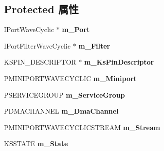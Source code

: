 \subsection*{Protected 属性}
\begin{DoxyCompactItemize}
\item 
\mbox{\label{class_c_port_pin_wave_cyclic_a8ba5536dbe46826ae5205a0c33d29007}} 
I\+Port\+Wave\+Cyclic $\ast$ {\bfseries m\+\_\+\+Port}
\item 
\mbox{\label{class_c_port_pin_wave_cyclic_ad934e90215fd723cbb0f575cbd99589e}} 
I\+Port\+Filter\+Wave\+Cyclic $\ast$ {\bfseries m\+\_\+\+Filter}
\item 
\mbox{\label{class_c_port_pin_wave_cyclic_ac46575b40634194e9d90d12258c23c81}} 
K\+S\+P\+I\+N\+\_\+\+D\+E\+S\+C\+R\+I\+P\+T\+OR $\ast$ {\bfseries m\+\_\+\+Ks\+Pin\+Descriptor}
\item 
\mbox{\label{class_c_port_pin_wave_cyclic_abaea9c6da08aff13c50a25810c9fb6bf}} 
P\+M\+I\+N\+I\+P\+O\+R\+T\+W\+A\+V\+E\+C\+Y\+C\+L\+IC {\bfseries m\+\_\+\+Miniport}
\item 
\mbox{\label{class_c_port_pin_wave_cyclic_a563268bb213ccf472036d452142c9d08}} 
P\+S\+E\+R\+V\+I\+C\+E\+G\+R\+O\+UP {\bfseries m\+\_\+\+Service\+Group}
\item 
\mbox{\label{class_c_port_pin_wave_cyclic_aa4a108d6ad2434eec11b5683fb89f91e}} 
P\+D\+M\+A\+C\+H\+A\+N\+N\+EL {\bfseries m\+\_\+\+Dma\+Channel}
\item 
\mbox{\label{class_c_port_pin_wave_cyclic_a173c5b112284e6ff6dcf446878a557b1}} 
P\+M\+I\+N\+I\+P\+O\+R\+T\+W\+A\+V\+E\+C\+Y\+C\+L\+I\+C\+S\+T\+R\+E\+AM {\bfseries m\+\_\+\+Stream}
\item 
\mbox{\label{class_c_port_pin_wave_cyclic_a567c68370169321294a0b7de38bc91d7}} 
K\+S\+S\+T\+A\+TE {\bfseries m\+\_\+\+State}
\item 
\mbox{\label{class_c_port_pin_wave_cyclic_a6c14b56e240ffcf35cc3ef07ed977be5}} 

\end{DoxyCompactItemize}
